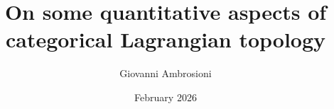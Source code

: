 \documentclass[12pt,reqno]{amsbook}
\theoremstyle{plain}
\theoremstyle{definition}
\theoremstyle{remark}
\numberwithin{section}{chapter}
\begin{document}
 
\title{On some quantitative aspects of categorical Lagrangian topology}

\date{February 2026}

\author{Giovanni Ambrosioni}

%
%

 




%

%



\maketitle


%
%





\tableofcontents 
\end{document}
